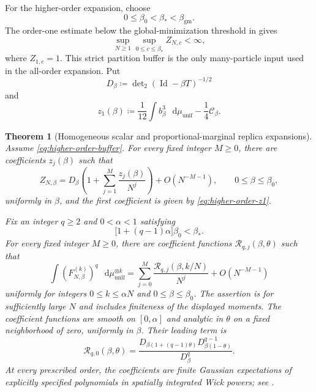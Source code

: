 \documentclass[11pt,reqno]{amsart}
\numberwithin{equation}{section}
\theoremstyle{plain}
\newtheorem{thm}{Theorem}[section]
\theoremstyle{definition}
\newcommand{\dd}{\mathop{}\!\mathrm d}
\newcommand{\Id}{\operatorname{Id}}
\newcommand{\be}{\beta}
\newcommand{\muunif}{\mu_{\mathrm{unif}}}
\newcommand{\gm}{\mathrm{gm}}
\begin{document}
For the higher-order expansion, choose
\begin{equation}
 0\leq\be_0<\be_*<\beta_{\gm}.
 \label{eq:higher-order-buffer}
\end{equation}
The order-one estimate below the global-minimization threshold in  gives
\begin{equation}
 \sup_{N\geq1}\sup_{0\leq c\leq\be_*}Z_{N,c}<\infty,
 \label{eq:higher-order-scalar-buffer}
\end{equation}
where $Z_{1,c}=1$.  This strict partition buffer is the only many-particle input used in the all-order expansion.  Put
\begin{equation}
 D_{\be}\coloneqq\det\nolimits_2(\Id-\be T)^{-1/2}
 \label{eq:higher-order-leading-determinant}
\end{equation}
and
\begin{equation}
 z_1(\be)
 \coloneqq\frac1{12}\int b_{\be}^3\,\dd\muunif-\frac14\mathcal C_{\be}.
 \label{eq:higher-order-z1}
\end{equation}

\begin{thm}[Homogeneous scalar and proportional-marginal replica expansions]
\label{thm:all-order-replica-expansions}
Assume \eqref{eq:higher-order-buffer}.  For every fixed integer $M\geq0$, there are coefficients $z_j(\be)$ such that
\begin{equation}
 Z_{N,\be}
 =D_{\be}\left(1+\sum_{j=1}^{M}\frac{z_j(\be)}{N^j}\right)
 +O(N^{-M-1}),
 \qquad 0\leq\be\leq\be_0,
 \label{eq:higher-order-scalar-expansion}
\end{equation}
uniformly in $\be$, and the first coefficient is given by \eqref{eq:higher-order-z1}.

Fix an integer $q\geq2$ and $0<\alpha<1$ satisfying
\begin{equation}
 \bigl[1+(q-1)\alpha\bigr]\be_0<\be_*.
 \label{eq:higher-order-qmargin}
\end{equation}
For every fixed integer $M\geq0$, there are coefficient functions $\mathcal R_{q,j}(\be,\theta)$ such that
\begin{equation}
 \int\left(F_{N,\be}^{(k)}\right)^q\,\dd\muunif^{\otimes k}
 =\sum_{j=0}^{M}\frac{\mathcal R_{q,j}(\be,k/N)}{N^j}
 +O(N^{-M-1})
 \label{eq:higher-order-replica-expansion}
\end{equation}
uniformly for integers $0\leq k\leq\alpha N$ and $0\leq\be\leq\be_0$.  The assertion is for sufficiently large $N$ and includes finiteness of the displayed moments.  The coefficient functions are smooth on $[0,\alpha]$ and analytic in $\theta$ on a fixed neighborhood of zero, uniformly in $\be$.  Their leading term is
\begin{equation}
 \mathcal R_{q,0}(\be,\theta)
 =\frac{D_{\be(1+(q-1)\theta)}D_{\be(1-\theta)}^{q-1}}{D_{\be}^q}.
 \label{eq:higher-order-leading-replica}
\end{equation}
At every prescribed order, the coefficients are finite Gaussian expectations of explicitly specified polynomials in spatially integrated Wick powers; see .
\end{thm}
\end{document}
